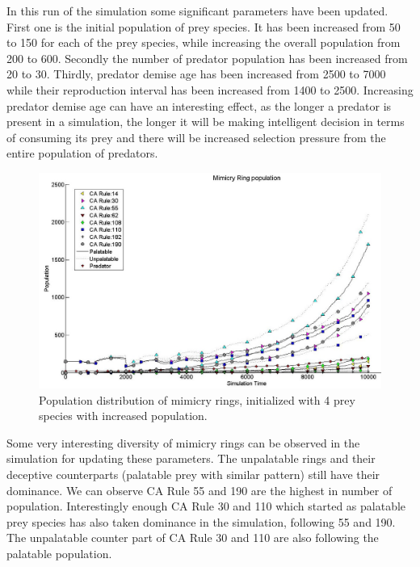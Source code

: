 In this run of the simulation some significant parameters have been updated. First one is the initial population of prey species. It has been increased from 50 to 150 for each of the prey species, while increasing the overall population from 200 to 600. Secondly the number of predator population has been increased from 20 to 30. Thirdly, predator demise age has been increased from 2500 to 7000 while their reproduction interval has been increased from 1400 to 2500. Increasing predator demise age can have an interesting effect, as the longer a predator is present in a simulation, the longer it will be making intelligent decision in terms of consuming its prey and there will be increased selection pressure from the entire population of predators. 

\begin{figure}[H]
	\centering
	\includegraphics[scale=0.45]{images/simTime10K-4MorePrey}
	\caption[Population distribution of mimicry rings (4 prey species, increased population)]{Population distribution of mimicry rings, initialized with 4 prey species with increased population.}
	\label{fig:plot-4-more-prey}
\end{figure}

Some very interesting diversity of mimicry rings can be observed in the simulation for updating these parameters. The unpalatable rings and their deceptive counterparts (palatable prey with similar pattern) still have their dominance. We can observe CA Rule 55 and 190 are the highest in number of population. Interestingly enough CA Rule 30 and 110 which started as palatable prey species has also taken dominance in the simulation, following 55 and 190. The unpalatable counter part of CA Rule 30 and 110 are also following the palatable population. 

